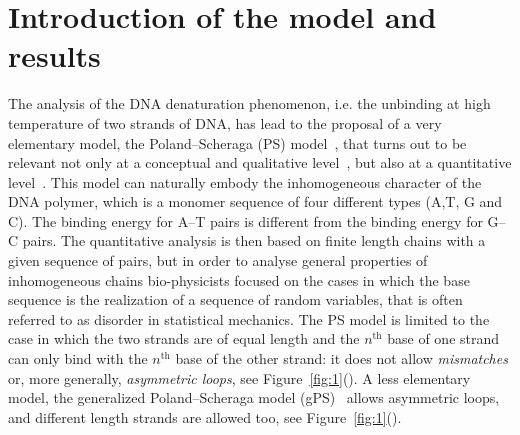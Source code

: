\documentclass[11pt]{article}
\theoremstyle{definition}
\numberwithin{equation}{section}
\numberwithin{figure}{section}
\numberwithin{table}{section}
\DeclareMathOperator{\tHt}{th}
\newcommand*\eqsubref[1]{(\subref{#1})} %
\begin{document}
\section{Introduction of the model and results}

The analysis of the DNA denaturation phenomenon, i.e. the unbinding at high temperature of two strands of DNA, has lead to the proposal of a very elementary model, the Poland--Scheraga (PS) model~\cite{cf:PSbook}, that turns out to be relevant not only at a conceptual and qualitative level~\cite{cf:Fisher,cf:GB}, but also at a quantitative level~\cite{cf:Blake2,cf:Blake1}. This model can naturally embody the inhomogeneous character of the DNA polymer, which is a monomer sequence of four different types (A,T, G and C). The binding energy for A--T pairs is different from the binding energy for G--C pairs. The quantitative analysis is then based on finite length chains with a given sequence of pairs, but in order to analyse general properties of inhomogeneous chains bio-physicists focused on the cases in which the base sequence is the realization of a sequence of random variables, that is often referred to as disorder in statistical mechanics. The PS model is limited to the case in which the two strands are of equal length and the $n^{\tHt}$ base of one strand can only bind with the $n^{\tHt}$ base of the other strand: it does not allow \emph{mismatches} or, more generally, \emph{asymmetric loops}, see Figure~\ref{fig:1}\eqsubref{fig:PS}. A less elementary model, the generalized Poland--Scheraga model (gPS)~\cite{cf:GK} allows asymmetric loops, and different length strands are allowed too, see Figure~\ref{fig:1}\eqsubref{fig:gPS}.

\end{document}
